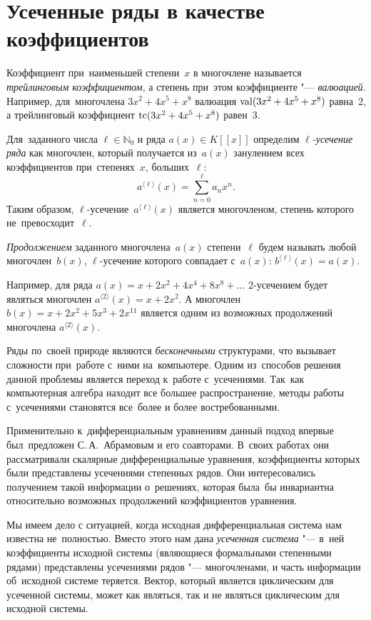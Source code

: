 \section{Усеченные ряды в качестве коэффициентов}

Коэффициент при~наименьшей степени~$x$ в многочлене называется \emph{трейлинговым коэффициентом},
а степень при~этом коэффициенте "--- \emph{валюацией}.
Например, для~многочлена $3x^2 + 4x^5 +x^8$ валюация $\mathop{\rm val}(3x^2 + 4x^5 +x^8)$ равна~$2$,
а трейлинговый коэффициент $\mathop{\rm tc}(3x^2 + 4x^5 +x^8)$ равен~$3$.

Для~заданного числа
$\ell \in \mathbb{N}_0$
и ряда
$a(x) \in K[[x]]$
определим \emph{$\ell$-усечение ряда} как многочлен, который получается из~$a(x)$
занулением всех коэффициентов при~степенях~$x$, больших~$\ell$:
\[
	a^{\langle \ell \rangle}(x) = \sum\limits_{n = 0}^{\ell} a_nx^n .
\]
Таким образом, $\ell$-усечение~$a^{\langle \ell \rangle}(x)$ является многочленом, степень которого не~превосходит~$\ell$.

\emph{Продолжением} заданного многочлена~$a(x)$ степени~$\ell$ будем называть любой многочлен~$b(x)$,
$\ell$-усечение которого совпадает с~$a(x)$: $b^{\langle \ell \rangle}(x) = a(x)$.

Например, для ряда $ a(x) = x + 2x^2 + 4x^4 + 8x^8 + \dots $ $2$-усечением будет являться многочлен $ a^{\langle 2 \rangle}(x) = x + 2x^2 $.
А многочлен $ b(x) = x + 2x^2 + 5x^3 + 2x^{11} $ является одним из возможных продолжений многочлена $a^{\langle 2 \rangle}(x)$.
\medskip

Ряды по~своей природе являются \emph{бесконечными} структурами, что вызывает сложности при~работе с~ними на~компьютере.
Одним из~способов решения данной проблемы является переход к~работе с~усечениями.
Так~как компьютерная алгебра находит все большее распространение,
методы работы с~усечениями становятся все~более и более востребованными.

Применительно к~дифференциальным уравнениям данный подход впервые был~предложен С.\,А.~Абрамовым и его соавторами.
В~своих работах \cite{litAbramovTruncatedSeries, litAbramovScalarEquations}
они рассматривали скалярные дифференциальные уравнения,
коэффициенты которых были представлены усечениями степенных рядов.
Они интересовались получением такой информации о~решениях,
которая была~бы инвариантна относительно возможных продолжений коэффициентов уравнения.

Мы имеем дело с ситуацией, когда исходная дифференциальная система нам известна не~полностью.
Вместо этого нам дана \emph{усеченная система} "--- в~ней коэффициенты исходной системы (являющиеся формальными степенными рядами) представлены
усечениями рядов "--- многочленами, и часть информации об~исходной системе теряется.
Вектор, который является циклическим для усеченной системы, может как являться, так и не являться циклическим для исходной системы.
\medskip

